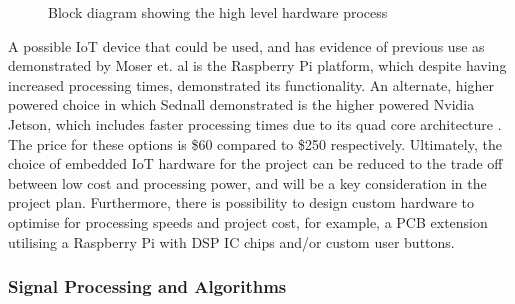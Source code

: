 \documentclass[12pt,a4paper]{article}
\begin{document}
\begin{figure}[htbp]
    \centering
    \caption{Block diagram showing the high level hardware process}
    \label{fig:signal_processing_flow}
    \end{figure}
    
\noindent A possible IoT device that could be used, and has evidence of previous use as demonstrated by Moser et. al \cite{IOTpassiveRadar} is the Raspberry Pi platform, which despite having increased processing times, demonstrated its functionality. An alternate, higher powered choice in which Sednall demonstrated is the higher powered Nvidia Jetson, which includes faster processing times due to its quad core architecture \cite{FMlowCost}. The price for these options is \$60 compared to \$250 respectively. Ultimately, the choice of embedded IoT hardware for the project can be reduced to the trade off between low cost and processing power, and will be a key consideration in the project plan. Furthermore, there is possibility to design custom hardware to optimise for processing speeds and project cost, for example, a PCB extension utilising a Raspberry Pi with DSP IC chips and/or custom user buttons.



\subsubsection{Signal Processing and Algorithms} 
\end{document}
